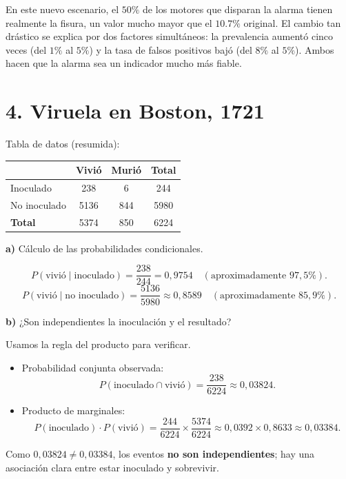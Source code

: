 \documentclass[11pt,letterpaper]{article}
\begin{document}
En este nuevo escenario, el $50\%$ de los motores que disparan la alarma tienen realmente la fisura, un valor mucho mayor que el $10.7\%$ original. El cambio tan drástico se explica por dos factores simultáneos: la prevalencia aumentó cinco veces (del $1\%$ al $5\%$) y la tasa de falsos positivos bajó (del $8\%$ al $5\%$). Ambos hacen que la alarma sea un indicador mucho más fiable.

\section*{4. Viruela en Boston, 1721}

Tabla de datos (resumida):

\begin{center}
\begin{tabular}{lccc}
\toprule
              & Vivió & Murió & Total \\
\midrule
Inoculado     & 238   & 6     & 244   \\
No inoculado  & 5136  & 844   & 5980  \\
\midrule
\textbf{Total} & 5374  & 850   & 6224  \\
\bottomrule
\end{tabular}
\end{center}

\textbf{a)} Cálculo de las probabilidades condicionales.

\[
P(\text{vivió} \mid \text{inoculado}) = \frac{238}{244} = 0{,}9754 \quad (\text{aproximadamente } 97{,}5\%).
\]
\[
P(\text{vivió} \mid \text{no inoculado}) = \frac{5136}{5980} \approx 0{,}8589 \quad (\text{aproximadamente } 85{,}9\%).
\]

\textbf{b)} ¿Son independientes la inoculación y el resultado?

Usamos la regla del producto para verificar.

\begin{itemize}
    \item Probabilidad conjunta observada:
    \[
    P(\text{inoculado} \cap \text{vivió}) = \frac{238}{6224} \approx 0{,}03824.
    \]
    \item Producto de marginales:
    \[
    P(\text{inoculado}) \cdot P(\text{vivió}) = \frac{244}{6224} \times \frac{5374}{6224} \approx 0{,}0392 \times 0{,}8633 \approx 0{,}03384.
    \]
\end{itemize}

Como $0{,}03824 \neq 0{,}03384$, los eventos \textbf{no son independientes}; hay una asociación clara entre estar inoculado y sobrevivir.
\end{document}
